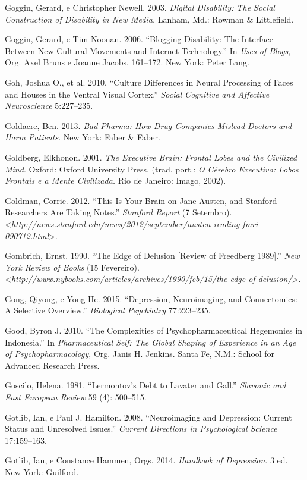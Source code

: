 Goggin, Gerard, e Christopher Newell. 2003. \emph{Digital Disability:
The Social Construction of Disability in New Media.} Lanham, Md.: Rowman
\& Littlefield.

Goggin, Gerard, e Tim Noonan. 2006. ``Blogging Disability: The Interface
Between New Cultural Movements and Internet Technology.'' In \emph{Uses
of Blogs}, Org. Axel Bruns e Joanne Jacobs, 161--172. New York: Peter
Lang.

Goh, Joshua O., et al. 2010. ``Culture Differences in Neural Processing
of Faces and Houses in the Ventral Visual Cortex.'' \emph{Social
Cognitive and Affective Neuroscience} 5:227--235.

Goldacre, Ben. 2013. \emph{Bad Pharma: How Drug Companies Mislead
Doctors and Harm Patients}. New York: Faber \& Faber.

Goldberg, Elkhonon. 2001. \emph{The Executive Brain: Frontal Lobes and
the Civilized Mind}. Oxford: Oxford University Press. (trad. port.:
\emph{O Cérebro Executivo: Lobos Frontais e a Mente Civilizada.} Rio de
Janeiro: Imago, 2002).

Goldman, Corrie. 2012. ``This Is Your Brain on Jane Austen, and Stanford
Researchers Are Taking Notes.'' \emph{Stanford Report} (7 Setembro).
\textless{}\emph{http://news.stanford.edu/news/2012/september/austen-reading-fmri-090712.html}\textgreater{}.

Gombrich, Ernst. 1990. ``The Edge of Delusion {[}Review of Freedberg
1989{]}.'' \emph{New York Review of Books} (15 Fevereiro).
\textless{}\emph{http://www.nybooks.com/articles/archives/1990/feb/15/the-edge-of-delusion/}\textgreater{}.

Gong, Qiyong, e Yong He. 2015. ``Depression, Neuroimaging, and
Connectomics: A Selective Overview.'' \emph{Biological Psychiatry}
77:223--235.

Good, Byron J. 2010. ``The Complexities of Psychopharmaceutical
Hegemonies in Indonesia.'' In \emph{Pharmaceutical Self: The Global
Shaping of Experience in an Age of Psychopharmacology}, Org. Janis H.
Jenkins. Santa Fe, N.M.: School for Advanced Research Press.

Goscilo, Helena. 1981. ``Lermontov's Debt to Lavater and Gall.''
\emph{Slavonic and East European Review} 59 (4): 500--515.

Gotlib, Ian, e Paul J. Hamilton. 2008. ``Neuroimaging and Depression:
Current Status and Unresolved Issues.'' \emph{Current Directions in
Psychological Science} 17:159--163.

Gotlib, Ian, e Constance Hammen, Orgs. 2014. \emph{Handbook of
Depression}. 3 ed. New York: Guilford.

